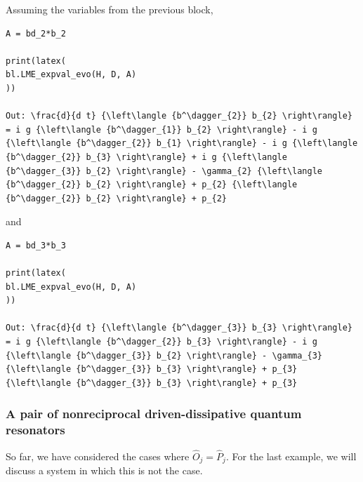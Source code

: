 \documentclass[onecolumn, 12pt, sort&compress]{elsarticle}
\begin{document}
Assuming the variables from the previous block,
\begin{verbatim}
A = bd_2*b_2

print(latex(
bl.LME_expval_evo(H, D, A)
))

Out: \frac{d}{d t} {\left\langle {b^\dagger_{2}} b_{2} \right\rangle} = i g {\left\langle {b^\dagger_{1}} b_{2} \right\rangle} - i g {\left\langle {b^\dagger_{2}} b_{1} \right\rangle} - i g {\left\langle {b^\dagger_{2}} b_{3} \right\rangle} + i g {\left\langle {b^\dagger_{3}} b_{2} \right\rangle} - \gamma_{2} {\left\langle {b^\dagger_{2}} b_{2} \right\rangle} + p_{2} {\left\langle {b^\dagger_{2}} b_{2} \right\rangle} + p_{2}
\end{verbatim}
and
\begin{verbatim}
A = bd_3*b_3

print(latex(
bl.LME_expval_evo(H, D, A)
))

Out: \frac{d}{d t} {\left\langle {b^\dagger_{3}} b_{3} \right\rangle} = i g {\left\langle {b^\dagger_{2}} b_{3} \right\rangle} - i g {\left\langle {b^\dagger_{3}} b_{2} \right\rangle} - \gamma_{3} {\left\langle {b^\dagger_{3}} b_{3} \right\rangle} + p_{3} {\left\langle {b^\dagger_{3}} b_{3} \right\rangle} + p_{3}
\end{verbatim}


\subsubsection{A pair of nonreciprocal driven-dissipative quantum resonators}

So far, we have considered the cases where $\hat{O}_j=\hat{P}_j$.  For the last example, we will discuss a system in which this is not the case. 
\end{document}
